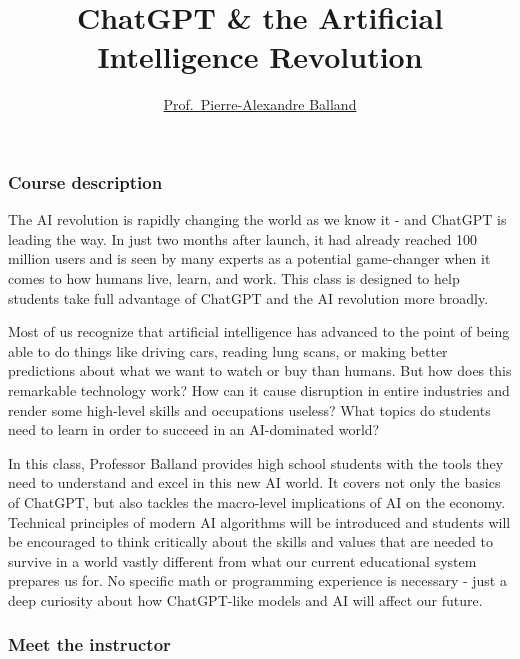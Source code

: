 \documentclass[
]{article}
\title{ChatGPT \& the Artificial Intelligence Revolution}
\author{\href{https://www.paballand.com/}{Prof.~Pierre-Alexandre
Balland}}
\date{}
\begin{document}
\maketitle

\hypertarget{course-description}{%
\subsubsection{Course description}\label{course-description}}

The AI revolution is rapidly changing the world as we know it - and
ChatGPT is leading the way. In just two months after launch, it had
already reached 100 million users and is seen by many experts as a
potential game-changer when it comes to how humans live, learn, and
work. This class is designed to help students take full advantage of
ChatGPT and the AI revolution more broadly.

Most of us recognize that artificial intelligence has advanced to the
point of being able to do things like driving cars, reading lung scans,
or making better predictions about what we want to watch or buy than
humans. But how does this remarkable technology work? How can it cause
disruption in entire industries and render some high-level skills and
occupations useless? What topics do students need to learn in order to
succeed in an AI-dominated world?

In this class, Professor Balland provides high school students with the
tools they need to understand and excel in this new AI world. It covers
not only the basics of ChatGPT, but also tackles the macro-level
implications of AI on the economy. Technical principles of modern AI
algorithms will be introduced and students will be encouraged to think
critically about the skills and values that are needed to survive in a
world vastly different from what our current educational system prepares
us for. No specific math or programming experience is necessary - just a
deep curiosity about how ChatGPT-like models and AI will affect our
future.

\hypertarget{meet-the-instructor}{%
\subsubsection{Meet the instructor}\label{meet-the-instructor}}
\end{document}
